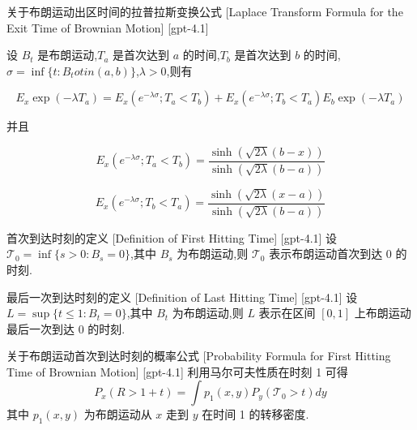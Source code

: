 \documentclass[UTF8]{ctexart}
\begin{document}
    
    
    \begin{thm}
        {关于布朗运动出区时间的拉普拉斯变换公式}
        [Laplace Transform Formula for the Exit Time of Brownian Motion]
        [gpt-4.1]
        
设 $B_t$ 是布朗运动,$T_a$ 是首次达到 $a$ 的时间,$T_b$ 是首次达到 $b$ 的时间,$\sigma = \inf\{ t : B_t 
otin (a, b) \}$,$\lambda > 0$,则有

\[
E_{x} \exp ( -\lambda T_{a} ) = E_{x} ( e^{-\lambda \sigma} ; T_{a} < T_{b} ) + E_{x} ( e^{-\lambda \sigma} ; T_{b} < T_{a} ) E_{b} \exp ( -\lambda T_{a} )
\]

并且

\[
E_{x} ( e^{-\lambda \sigma} ; T_{a} < T_{b} ) = \frac{\sinh ( \sqrt{2\lambda} ( b - x ) )}{\sinh ( \sqrt{2\lambda} ( b - a ) ) }
\]

\[
E_{x} ( e^{-\lambda \sigma} ; T_{b} < T_{a} ) = \frac{\sinh ( \sqrt{2\lambda} ( x - a ) )}{\sinh ( \sqrt{2\lambda} ( b - a ) ) }
\]

    \end{thm}
    
    
    
    \begin{dfn}
        {首次到达时刻的定义}
        [Definition of First Hitting Time]
        [gpt-4.1]
        设 $\mathcal{T}_0 = \inf\{ s > 0 : B_s = 0 \}$,其中 $B_s$ 为布朗运动,则 $\mathcal{T}_0$ 表示布朗运动首次到达 0 的时刻.
    \end{dfn}
    
    
    
    \begin{dfn}
        {最后一次到达时刻的定义}
        [Definition of Last Hitting Time]
        [gpt-4.1]
        设 $L = \sup\{ t \leq 1 : B_t = 0 \}$,其中 $B_t$ 为布朗运动,则 $L$ 表示在区间 $[0,1]$ 上布朗运动最后一次到达 0 的时刻.
    \end{dfn}
    
    
    
    \begin{thm}
        {关于布朗运动首次到达时刻的概率公式}
        [Probability Formula for First Hitting Time of Brownian Motion]
        [gpt-4.1]
        利用马尔可夫性质在时刻 1 可得
\[
P_x(R > 1 + t) = \int p_1(x, y) P_y(\mathcal{T}_0 > t) dy
\]
其中 $p_1(x, y)$ 为布朗运动从 $x$ 走到 $y$ 在时间 1 的转移密度.
    \end{thm}
    
\end{document}
